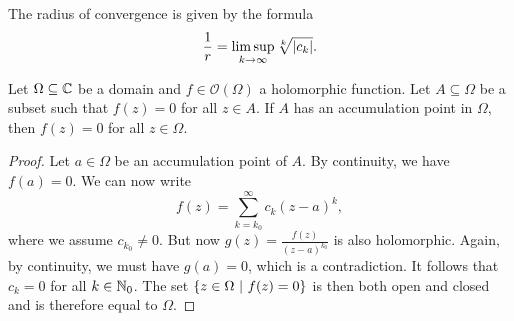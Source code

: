 \begin{opomba}
The radius of convergence is given by the formula
\[
\frac{1}{r} = \limsup_{k \to \infty} \sqrt[k]{\left\lvert c_k\right\rvert}.
\]
\end{opomba}

\begin{izrek}[Identity]
Let $\Omega \subseteq \mathbb{C}$ be a domain and
$f \in \mathcal{O}(\Omega)$ a holomorphic function. Let
$A \subseteq \Omega$ be a subset such that $f(z) = 0$ for all
$z \in A$. If $A$ has an accumulation point in $\Omega$, then
$f(z) = 0$ for all $z \in \Omega$.
\end{izrek}

\begin{proof}
Let $a \in \Omega$ be an accumulation point of $A$. By continuity,
we have $f(a) = 0$. We can now write
\[
f(z) = \sum_{k=k_0}^\infty c_k (z - a)^k,
\]
where we assume $c_{k_0} \ne 0$. But now
$g(z) = \frac{f(z)}{(z-a)^{k_0}}$ is also holomorphic. Again, by
continuity, we must have $g(a) = 0$, which is a contradiction. It
follows that $c_k = 0$ for all $k \in \mathbb{N}_0$. The set
$\left\{z \in \Omega~\middle\vert~f(z) = 0\right\}$ is then both open and closed and
is therefore equal to $\Omega$.
\end{proof}
